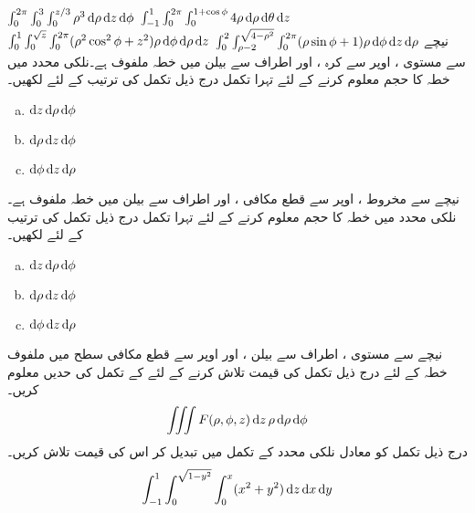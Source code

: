 $\int_{0}^{2\pi}\int_{0}^{3}\int_{0}^{z/3} \rho^3\dif\rho \dif z\dif \phi$
$\int_{-1}^{1}\int_{0}^{2\pi}\int_{0}^{1+\cos\phi} 4\rho\dif\rho \dif \theta\dif z$
$\int_{0}^{1}\int_{0}^{\sqrt{z}}\int_{0}^{2\pi}(\rho^2\cos^2\phi+z^2)\rho \dif\phi\dif\rho \dif z$
$\int_{0}^{2}\int_{\rho-2}^{\sqrt{4-\rho^2}}\int_{0}^{2\pi} (\rho\sin\phi+1)\rho \dif \phi \dif z\dif \rho$
نیچے سے مستوی ، اوپر سے کرہ ، اور اطراف سے بیلن  میں  خطہ   ملفوف ہے۔نلکی محدد میں  خطہ  کا حجم معلوم کرنے کے لئے تہرا تکمل درج ذیل  تکمل کی ترتیب کے لئے لکھیں۔
\begin{multicols}{3}
\begin{enumerate}[a.]
\item
$\dif z\dif \rho\dif\phi$
\item
$\dif \rho\dif z\dif\phi$
\item
$\dif \phi\dif z\dif\rho$
\end{enumerate}
\end{multicols}
نیچے سے مخروط  ، اوپر سے قطع مکافی  ، اور اطراف سے بیلن  میں  خطہ   ملفوف ہے۔نلکی محدد میں  خطہ  کا حجم معلوم کرنے کے لئے تہرا تکمل درج ذیل  تکمل کی ترتیب کے لئے لکھیں۔
\begin{multicols}{3}
\begin{enumerate}[a.]
\item
$\dif z\dif \rho\dif\phi$
\item
$\dif \rho\dif z\dif\phi$
\item
$\dif \phi\dif z\dif\rho$
\end{enumerate}
\end{multicols}
نیچے سے مستوی ،  اطراف سے بیلن ، اور اوپر سے قطع مکافی سطح  میں ملفوف خطہ  کے لئے درج ذیل تکمل کی قیمت تلاش کرنے کے لئے  کے تکمل کی  حدیں معلوم کریں۔
\begin{align*}
\iiint F(\rho,\phi,z)\dif z\,\rho \dif \rho\dif\phi
\end{align*}
درج ذیل تکمل کو معادل نلکی محدد کے تکمل میں تبدیل کر  اس کی قیمت تلاش کریں۔
\begin{align*}
\int_{-1}^1 \int_0^{\sqrt{1-y^2}}\int_0^x (x^2+y^2)\dif z\dif x\dif y
\end{align*}

